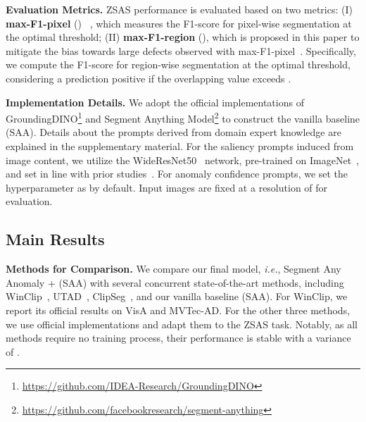 \documentclass{article}
\begin{document}
\noindent\textbf{Evaluation Metrics.} ZSAS performance is evaluated based on two metrics: 
\noindent (I) \textbf{max-F1-pixel} () ~\cite{jeong2023winclip}, which measures the F1-score for pixel-wise segmentation at the optimal threshold; 
\noindent (II) \textbf{max-F1-region} (), which is proposed in this paper to mitigate the bias towards large defects observed with max-F1-pixel~\cite{bergmann2019mvtec}. Specifically, we compute the F1-score for region-wise segmentation at the optimal threshold, considering a prediction positive if the overlapping value exceeds .

\vspace{0.05in}

\noindent\textbf{Implementation Details.} We adopt the official implementations of GroundingDINO\footnote{\url{https://github.com/IDEA-Research/GroundingDINO}} and Segment Anything Model\footnote{\url{https://github.com/facebookresearch/segment-anything}} to construct the vanilla baseline (SAA). Details about the prompts derived from domain expert knowledge are explained in the supplementary material. For the saliency prompts induced from image content, we utilize the WideResNet50~\cite{zagoruyko2016wideresnet} network, pre-trained on ImageNet~\cite{hinton2012imagenet}, and set  in line with prior studies~\cite{aota2023zero}. For anomaly confidence prompts, we set the hyperparameter  as  by default. Input images are fixed at a resolution of  for evaluation.


\subsection{Main Results}
\label{sec:exp_main}

\noindent\textbf{Methods for Comparison.}  We compare our final model, \textit{i.e.}, Segment Any Anomaly + (SAA) with several concurrent state-of-the-art methods, including WinClip~\cite{jeong2023winclip}, UTAD~\cite{aota2023zero}, ClipSeg~\cite{clipseg2022}, and our vanilla baseline (SAA). For WinClip, we report its official results on VisA and MVTec-AD. For the other three methods, we use official implementations and adapt them to the ZSAS task. Notably, as all methods require no training process, their performance is stable with a variance of . 
\end{document}

